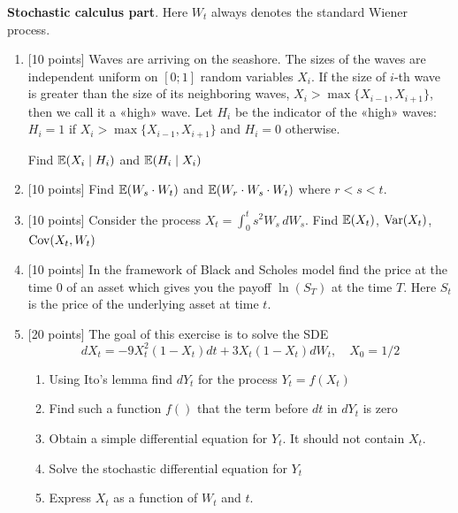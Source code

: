 \documentclass[12pt, a4paper]{article}
\begin{document}
\vspace{20pt}

\textbf{Stochastic calculus part}. Here $W_t$ always denotes the standard Wiener process.

\vspace{20pt}

\begin{enumerate}[resume]
\item $[$10 points] Waves are arriving on the seashore. The sizes of the waves are independent uniform on $[0;1]$ random variables $X_i$. If the size of $i$-th wave is greater than the size of its neighboring waves, $X_i>\max\{X_{i-1},X_{i+1}\}$, then we call it a «high» wave. Let $H_i$ be the indicator of the «high» waves: $H_i=1$ if $X_i>\max\{X_{i-1},X_{i+1}\}$ and $H_i=0$ otherwise.

Find $\operatorname{\mathbb{E}}(X_i \mid H_i)$ and $\operatorname{\mathbb{E}}(H_i \mid X_i)$
\item $[$10 points] Find $\operatorname{\mathbb{E}}(W_s \cdot W_t)$ and $\operatorname{\mathbb{E}}(W_r \cdot W_s \cdot W_t)$ where $r<s<t$.
\item $[$10 points] Consider the process $X_t=\int_0^t s^2 W_s\,dW_s$. Find $\operatorname{\mathbb{E}}(X_t)$, $\operatorname{Var}(X_t)$, $\operatorname{Cov}(X_t,W_t)$
\item $[$10 points] In the framework of Black and Scholes model find the price at the time $0$ of an asset which gives you the payoff $\ln(S_T)$ at the time $T$. Here $S_t$ is the price of the underlying asset at time $t$.

\item $[$20 points] The goal of this exercise is to solve the SDE
\[
dX_t=-9X_t^2(1-X_t)dt+3X_t(1-X_t)dW_t,\quad X_0=1/2
\]
\begin{enumerate}
\item Using Ito's lemma find $dY_t$ for the process $Y_t=f(X_t)$
\item Find such a function $f()$ that the term before $dt$ in $dY_t$ is zero
\item Obtain a simple differential equation for $Y_t$. It should not contain $X_t$.
\item Solve the stochastic differential equation for $Y_t$
\item Express $X_t$ as a function of $W_t$ and $t$.
\end{enumerate}

\end{enumerate}
\end{document}
